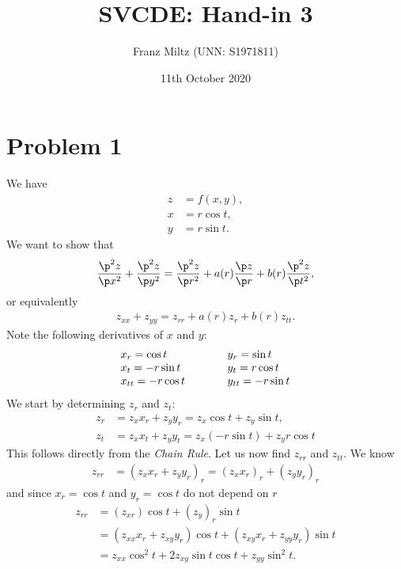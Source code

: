 \documentclass{article}
\begin{document}
\title{SVCDE: Hand-in 3}
\author{Franz Miltz (UNN: S1971811)}
\date{11th October 2020}
\maketitle


\section*{Problem 1}


We have
\begin{align*}
  z & = f(x,y),  \\
  x & = r\cos t, \\
  y & = r\sin t.
\end{align*}
We want to show that
\begin{align*}
  \frac{\p^2 z}{\p x^2}+\frac{\p^2 z}{\p y^2}
  = \frac{\p^2 z}{\p r^2}+a(r)\frac{\p z}{\p r}+b(r)\frac{\p^2 z}{\p t^2},
\end{align*}
or equivalently
\begin{align}
  \label{eq1}
  z_{xx} + z_{yy} = z_{rr} + a(r)z_r + b(r)z_{tt}.
\end{align}
Note the following derivatives of $x$ and $y$:
\begin{align*}
  \begin{array}{l l}
    x_r = \cos t      & \hspace{1cm} y_r = \sin t      \\
    x_t = -r\sin t    & \hspace{1cm} y_t = r\cos t     \\
    x_{tt} = -r\cos t & \hspace{1cm} y_{tt} = -r\sin t
  \end{array}
\end{align*}
We start by determining $z_r$ and $z_t$:
\begin{align*}
  z_r & = z_x x_r + z_y y_r = z_x \cos t + z_y \sin t,     \\
  z_t & = z_x x_t + z_y y_t = z_x (-r\sin t) + z_y r\cos t
\end{align*}
This follows directly from the \emph{Chain Rule}.
Let us now find $z_{rr}$ and $z_{tt}$. We know
\begin{align*}
  z_{rr} & = (z_x x_r + z_y y_r)_r = (z_x x_r)_r + (z_y y_r)_r
\end{align*}
and since $x_r = \cos t$ and $y_r = \cos t$ do not depend on $r$
\begin{align*}
  z_{rr} & = (z_{xr})\cos t + (z_y)_r \sin t                              \\
         & =(z_{xx}x_r + z_{xy}y_r)\cos t + (z_{xy}x_r + z_{yy}y_r)\sin t \\
         & =z_{xx}\cos^2 t + 2 z_{xy}\sin t\cos t + z_{yy}\sin^2 t.
\end{align*}
\end{document}
